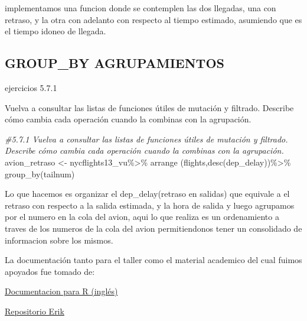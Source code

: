 \documentclass[
]{article}
\newenvironment{Shaded}{\begin{snugshade}}{\end{snugshade}}
\newcommand{\CommentTok}[1]{\textcolor[rgb]{0.56,0.35,0.01}{\textit{#1}}}
\newcommand{\FunctionTok}[1]{\textcolor[rgb]{0.00,0.00,0.00}{#1}}
\newcommand{\NormalTok}[1]{#1}
\newcommand{\OtherTok}[1]{\textcolor[rgb]{0.56,0.35,0.01}{#1}}
\newcommand{\SpecialCharTok}[1]{\textcolor[rgb]{0.00,0.00,0.00}{#1}}
\begin{document}
implementamos una funcion donde se contemplen las dos llegadas, una con
retraso, y la otra con adelanto con respecto al tiempo estimado,
asumiendo que es el tiempo idoneo de llegada.

\hypertarget{group_by-agrupamientos}{%
\subsection{GROUP\_BY AGRUPAMIENTOS}\label{group_by-agrupamientos}}

ejercicios 5.7.1

Vuelva a consultar las listas de funciones útiles de mutación y
filtrado. Describe cómo cambia cada operación cuando la combinas con la
agrupación.

\begin{Shaded}
\begin{Highlighting}[]
\CommentTok{\#5.7.1 Vuelva a consultar las listas de funciones útiles de mutación y filtrado. Describe cómo cambia cada operación cuando la combinas con la agrupación.}
\NormalTok{avion\_retraso }\OtherTok{\textless{}{-}}\NormalTok{ nycflights13\_vu}\SpecialCharTok{\%\textgreater{}\%}
\FunctionTok{arrange}\NormalTok{ (flights,}\FunctionTok{desc}\NormalTok{(dep\_delay))}\SpecialCharTok{\%\textgreater{}\%}
\FunctionTok{group\_by}\NormalTok{(tailnum)}
\end{Highlighting}
\end{Shaded}

Lo que hacemos es organizar el dep\_delay(retraso en salidas) que
equivale a el retraso con respecto a la salida estimada, y la hora de
salida y luego agrupamos por el numero en la cola del avion, aqui lo que
realiza es un ordenamiento a traves de los numeros de la cola del avion
permitiendonos tener un consolidado de informacion sobre los mismos.

La documentación tanto para el taller como el material academico del
cual fuimos apoyados fue tomado de:

\href{https://r4ds.had.co.nz/transform.html}{Documentacion para R
(inglés)}

\href{https://github.com/ErikCastillor/entregar1ercorte}{Repositorio
Erik}
\end{document}
